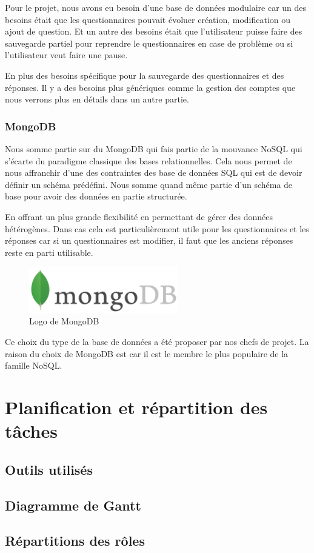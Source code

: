 Pour le projet, nous avons eu besoin d'une base de données modulaire car un des besoins
était que les questionnaires pouvait évoluer création, modification ou ajout de 
question. Et un autre des besoins était que l'utilisateur puisse faire des sauvegarde 
partiel pour reprendre le questionnaires en case de problème ou si l'utilisateur veut 
faire une pause. 

En plus des besoins spécifique pour la sauvegarde des questionnaires et des réponses. 
Il y a des besoins plus génériques comme la gestion des comptes que nous verrons plus 
en détails dans un autre partie.

\subsubsection{MongoDB}

Nous somme partie sur du MongoDB qui fais partie de la mouvance NoSQL qui s'écarte du 
paradigme classique des bases relationnelles. Cela nous permet de nous affranchir 
d'une des contraintes des base de données SQL qui est de devoir définir un schéma 
prédéfini. Nous somme quand même partie d'un schéma de base pour avoir des données en 
partie structurée.

En offrant un plus grande flexibilité en permettant de gérer des données hétérogènes. 
Dans cas cela est particulièrement utile pour les questionnaires et les réponses car 
si un questionnaires est modifier, il faut que les anciens réponses reste en parti 
utilisable.

\begin{figure}[H]
    \begin{center}
    \includegraphics[height=2.0cm]{img/mongodb}
    \end{center}
    \caption{Logo de MongoDB}
\end{figure}

Ce choix du type de la base de données a été proposer par nos chefs de projet. La 
raison du choix de MongoDB est car il est le membre le plus populaire de la famille 
NoSQL.   

\section{Planification et répartition des tâches}

\subsection{Outils utilisés}


\subsection{Diagramme de Gantt}


\subsection{Répartitions des rôles}
